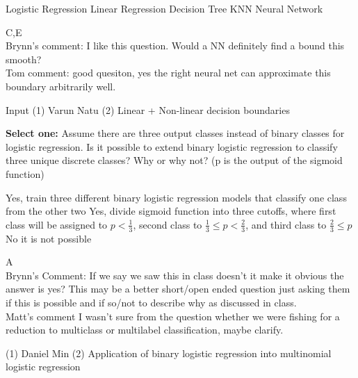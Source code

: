 \begin{questions}
{\begin{checkboxes}
     \choice Logistic Regression 
     \choice Linear Regression
     \choice Decision Tree
     \choice KNN
     \choice Neural Network
    \end{checkboxes}
    }
    \begin{soln}
    C,E\\
    Brynn's comment: I like this question. Would a NN definitely find a bound this smooth? \\ Tom comment: good quesiton, yes the right neural net can approximate this boundary arbitrarily well.
    \end{soln}
    \begin{qauthor}
    Input (1) Varun Natu (2) Linear + Non-linear decision boundaries 
    \end{qauthor}


\question[1] \textbf{Select one:} Assume there are three output classes instead of binary classes for logistic regression. Is it possible to extend binary logistic regression to classify three unique discrete classes? Why or why not? (p is the output of the sigmoid function)
    \begin{checkboxes}
     \choice Yes, train three different binary logistic regression models that classify one class from the other two
     \choice Yes, divide sigmoid function into three cutoffs, where first class will be assigned to $p < \frac{1}{3}$, second class to $\frac{1}{3} \leq p < \frac{2}{3}$, and third class to  $\frac{2}{3} \leq p$
     \choice No it is not possible
    \end{checkboxes}
    \begin{soln}
    A\\
    
    Brynn's Comment: If we say we saw this in class doesn't it make it obvious the answer is yes? This may be a better short/open ended question just asking them if this is possible and if so/not to describe why as discussed in class.  \\ Matt's comment I wasn't sure from the question whether we were fishing for a reduction to multiclass or multilabel classification, maybe clarify.
    \end{soln}
    \begin{qauthor}
    (1) Daniel Min (2) Application of binary logistic regression into multinomial logistic regression
   
    \end{qauthor}



\end{questions}
